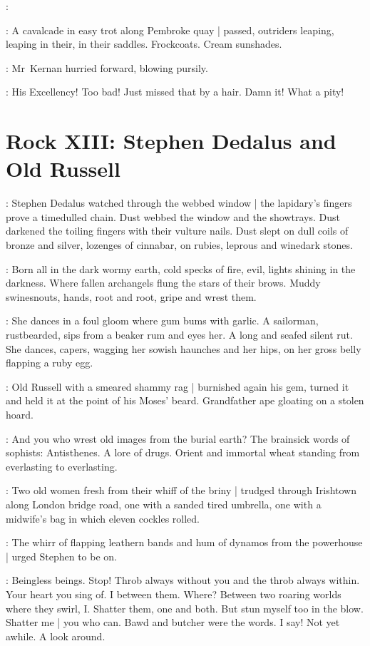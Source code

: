 :

:
A cavalcade in easy trot along Pembroke quay |
passed,
outriders leaping, leaping in their, in their saddles.
Frockcoats.
Cream sunshades.

:
Mr~Kernan hurried forward,
blowing pursily.

:
His Excellency!
Too bad!
Just missed that by a hair.
Damn it!
What a pity!


\section*{Rock XIII: Stephen Dedalus and Old Russell}


:
Stephen Dedalus watched through the webbed window |
the lapidary's fingers prove a timedulled chain.
Dust webbed the window and the showtrays.
Dust darkened the toiling fingers with their vulture nails.
Dust slept on dull coils of bronze and silver,
lozenges of cinnabar,
on rubies,
leprous and winedark stones.

\StephenInt:
Born all in the dark wormy earth,
cold specks of fire,
evil, lights shining in the darkness.
Where fallen archangels flung the stars of their brows.
Muddy swinesnouts,
hands,
root and root,
gripe and wrest them.

\StephenInt:
She dances in a foul gloom where gum bums with garlic.
A sailorman, rustbearded, sips from a beaker rum and eyes her.
A long and seafed silent rut.%
She dances, capers,
wagging her sowish haunches and her hips,
on her gross belly flapping a ruby egg.

:
Old Russell with a smeared shammy rag |
burnished again his gem,
turned it
and held it at the point of his Moses' beard.
Grandfather ape gloating on a stolen hoard.

\StephenInt:
And you who wrest old images from the burial earth?
The brainsick words of sophists:
Antisthenes.
A lore of drugs.
Orient and immortal wheat
standing from everlasting to everlasting.

:
Two old women
fresh from their whiff of the briny |
trudged through Irishtown along London bridge road,
one with a sanded tired umbrella,
one with a midwife's bag%
in which eleven cockles rolled.

:
The whirr of flapping leathern bands
and hum of dynamos from the powerhouse |
urged Stephen to be on.

\StephenInt:
Beingless beings.
Stop!
Throb always without you
and the throb always within.
Your heart you sing of.
I between them.
Where?
Between two roaring worlds where they swirl, I.
Shatter them, one and both.
But stun myself too in the blow.
Shatter me |
you who can.
Bawd and butcher were the words.
I say!
Not yet awhile.
A look around.

